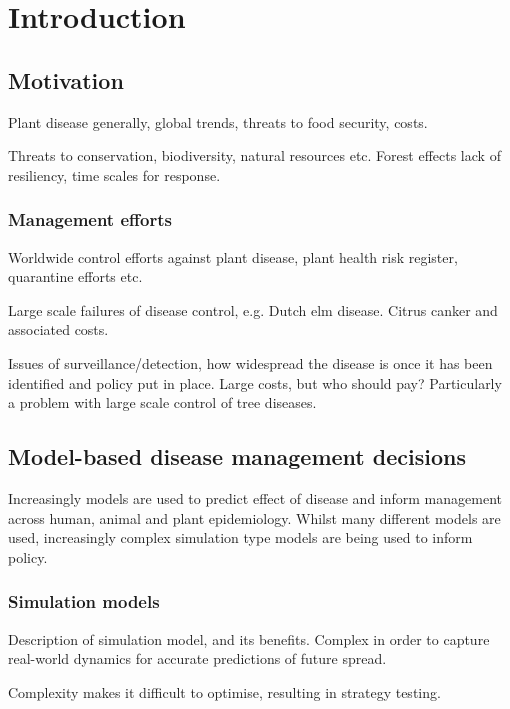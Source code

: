 %

\chapter{Introduction}\label{ch:intro}

\section{Motivation}

Plant disease generally, global trends, threats to food security, costs.

Threats to conservation, biodiversity, natural resources etc. Forest effects lack of resiliency, time scales for response.

\subsection{Management efforts}

Worldwide control efforts against plant disease, plant health risk register, quarantine efforts etc.

Large scale failures of disease control, e.g. Dutch elm disease. Citrus canker and associated costs.

Issues of surveillance/detection, how widespread the disease is once it has been identified and policy put in place. Large costs, but who should pay? Particularly a problem with large scale control of tree diseases.

\section{Model-based disease management decisions}

Increasingly models are used to predict effect of disease and inform management across human, animal and plant epidemiology. Whilst many different models are used, increasingly complex simulation type models are being used to inform policy.

\subsection{Simulation models}

Description of simulation model, and its benefits. Complex in order to capture real-world dynamics for accurate predictions of future spread.

Complexity makes it difficult to optimise, resulting in strategy testing.

